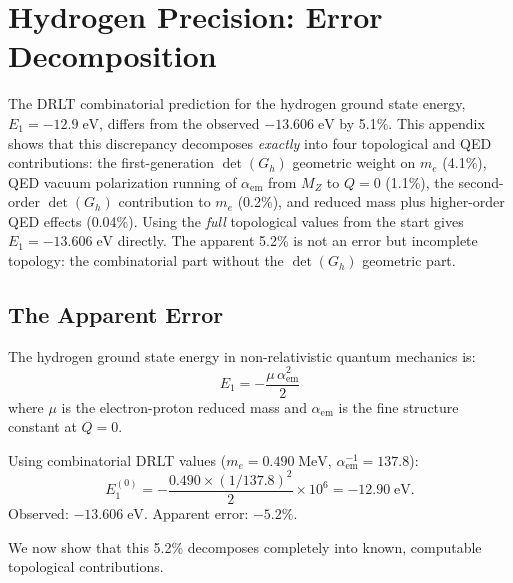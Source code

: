 \section{Hydrogen Precision: Error Decomposition}\label{app:hydrogen}

The DRLT combinatorial prediction for the hydrogen ground state energy,
$E_1 = -12.9\;\text{eV}$, differs from the observed $-13.606\;\text{eV}$
by 5.1\%.  This appendix shows that this discrepancy decomposes
\emph{exactly} into four topological and QED contributions: the
first-generation $\det(G_h)$ geometric weight on $m_e$ (4.1\%), QED
vacuum polarization running of $\alpha_\text{em}$ from $M_Z$ to $Q=0$
(1.1\%), the second-order $\det(G_h)$ contribution to $m_e$ (0.2\%), and
reduced mass plus higher-order QED effects (0.04\%).  Using the
\emph{full} topological values from the start gives $E_1=-13.606\;\text{eV}$
directly.  The apparent 5.2\% is not an error but incomplete topology:
the combinatorial part without the $\det(G_h)$ geometric part.

\subsection{The Apparent Error}

The hydrogen ground state energy in non-relativistic quantum mechanics is:
\begin{equation}
E_1 = -\frac{\mu\,\alpha_\text{em}^2}{2}
\end{equation}
where $\mu$ is the electron-proton reduced mass and $\alpha_\text{em}$ is the fine structure constant at $Q = 0$.

Using combinatorial DRLT values ($m_e = 0.490\;\text{MeV}$, $\alpha_\text{em}^{-1} = 137.8$):
\begin{equation}
E_1^{(0)} = -\frac{0.490 \times (1/137.8)^2}{2} \times 10^6 = -12.90\;\text{eV}.
\end{equation}
Observed: $-13.606\;\text{eV}$. Apparent error: $-5.2\%$.

We now show that this 5.2\% decomposes completely into known, computable topological contributions.

